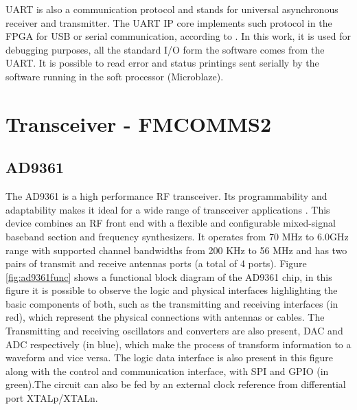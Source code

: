 UART is also a communication protocol and stands for universal asynchronous
receiver and transmitter. The UART IP core implements such protocol in the
FPGA for USB or serial communication, according to \cite{xilinx:axiuart}. In
this work, it is used for debugging purposes, all the standard I/O form the
software comes from the UART. It is possible to read error and status
printings sent serially by the software running in the soft processor
(Microblaze).

\section{Transceiver - FMCOMMS2}
\label{impl:fmcomms2}

\subsection{AD9361}
\label{trans:ad9361}

The AD9361 is a high performance RF transceiver. Its programmability and
adaptability makes it ideal for a wide range of transceiver applications
\cite{web:ad9361wiki}. This device combines an RF front end with a flexible and
configurable mixed-signal baseband section and frequency synthesizers. It
operates from 70 MHz to 6.0GHz range with supported channel bandwidths from 200
KHz to 56 MHz and has two pairs of transmit and receive antennas ports (a total
of 4 ports). Figure \ref{fig:ad9361func} shows a functional block diagram of the
AD9361 chip, in this figure it is possible to observe the logic and physical
interfaces highlighting the basic components of both, such as the transmitting
and receiving interfaces (in red), which represent the physical connections with
antennas or cables. The Transmitting and receiving oscillators and converters
are also present, DAC and ADC respectively (in blue), which make the process of
transform information to a waveform and vice versa. The logic data interface is
also present in this figure along with the control and communication interface,
with SPI and GPIO (in green).The circuit can also be fed by an external clock
reference from differential port XTALp/XTALn.

